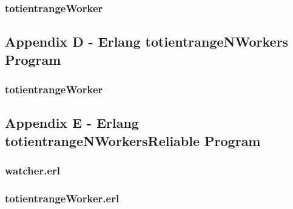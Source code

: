 \documentclass[11pt,a4paper,titlepage]{article}
\begin{document}
\subsubsection{totientrangeWorker}
\lstset{linewidth=\textwidth}
{\footnotesize}

\subsection{Appendix D - Erlang totientrangeNWorkers Program}
\lstset{linewidth=\textwidth}
{\footnotesize}

\subsubsection{totientrangeWorker}
\lstset{linewidth=\textwidth}
{\footnotesize}

\subsection{Appendix E - Erlang totientrangeNWorkersReliable Program}
\lstset{linewidth=\textwidth}
{\footnotesize}

\subsubsection{watcher.erl}
\lstset{linewidth=\textwidth}
{\footnotesize}

\subsubsection{totientrangeWorker.erl}
\lstset{linewidth=\textwidth}
{\footnotesize}
\end{document}
